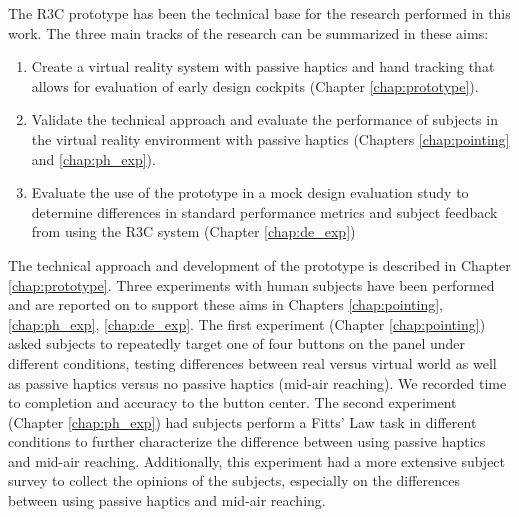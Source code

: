 The R3C prototype has been the technical base for the research performed in this work.
The three main tracks of the research can be summarized in these aims:
\begin{enumerate}
    \item Create a virtual reality system with passive haptics and hand tracking that allows for evaluation of early design cockpits (Chapter \ref{chap:prototype}).
    \item Validate the technical approach and evaluate the performance of subjects in the virtual reality environment with passive haptics (Chapters \ref{chap:pointing} and \ref{chap:ph_exp}).
    \item Evaluate the use of the prototype in a mock design evaluation study to determine differences in standard performance metrics and subject feedback from using the R3C system (Chapter \ref{chap:de_exp})
\end{enumerate}
The technical approach and development of the prototype is described in Chapter \ref{chap:prototype}.
Three experiments with human subjects have been performed and are reported on to support these aims in Chapters \ref{chap:pointing}, \ref{chap:ph_exp}, \ref{chap:de_exp}.
The first experiment (Chapter \ref{chap:pointing}) asked subjects to repeatedly target one of four buttons on the panel under different conditions, testing differences between real versus virtual world as well as passive haptics versus no passive haptics (mid-air reaching).
We recorded time to completion and accuracy to the button center.
The second experiment (Chapter \ref{chap:ph_exp}) had subjects perform a Fitts' Law task in different conditions to further characterize the difference between using passive haptics and mid-air reaching.
Additionally, this experiment had a more extensive subject survey to collect the opinions of the subjects, especially on the differences between using passive haptics and mid-air reaching.
